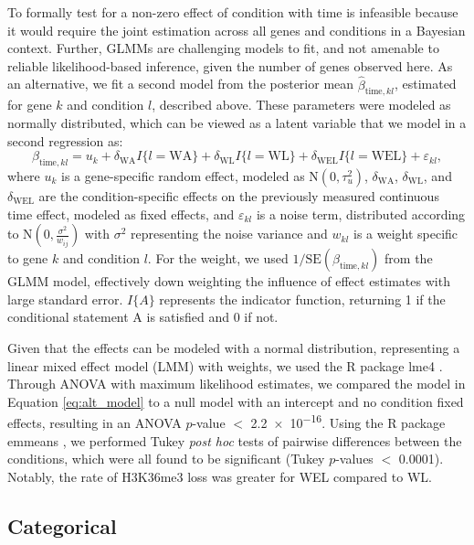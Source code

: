 \documentclass[12pt]{extarticle}
\begin{document}
To formally test for a non-zero effect of condition with time is infeasible because it would require the joint estimation across all genes and conditions in a Bayesian context. Further, GLMMs are challenging models to fit, and not amenable to reliable likelihood-based inference, given the number of genes observed here. As an alternative, we fit a second model from the posterior mean $\widehat{\beta}_{\text{time}, kl}$, estimated for gene $k$ and condition $l$, described above. These parameters were modeled as normally distributed, which can be viewed as a latent variable that we model in a second regression as:
\begin{equation}
	\beta_{\text{time}, kl} = u_{k} + \delta_{\text{WA}}I\{l = \text{WA}\} + \delta_{\text{WL}}I\{l = \text{WL}\} + \delta_{\text{WEL}}I\{l = \text{WEL}\} + \varepsilon_{kl},
	\label{eq:alt_model}
\end{equation}
where $u_{k}$ is a gene-specific random effect, modeled as $\text{N}(0, \tau^{2}_{u})$, $\delta_{\text{WA}}$, $\delta_{\text{WL}}$, and $\delta_{\text{WEL}}$ are the condition-specific effects on the previously measured continuous time effect, modeled as fixed effects, and $\varepsilon_{kl}$ is a noise term, distributed according to $\text{N}(0, \frac{\sigma^{2}}{w_{ij}})$ with $\sigma^{2}$ representing the noise variance and $w_{kl}$ is a weight specific to gene $k$ and condition $l$. For the weight, we used $1/\text{SE}(\beta_{\text{time}, kl})$ from the GLMM model, effectively down weighting the influence of effect estimates with large standard error. $I\{A\}$ represents the indicator function, returning 1 if the conditional statement A is satisfied and 0 if not. 

Given that the effects can be modeled with a normal distribution, representing a linear mixed effect model (LMM) with weights, we used the R package lme4 \cite{Bates2015}. Through ANOVA \cite{Venables2010} with maximum likelihood estimates, we compared the model in Equation \ref{eq:alt_model} to a null model with an intercept and no condition fixed effects, resulting in an ANOVA $p$-value $<$ \num{2.2e-16}. Using the R package emmeans \cite{emmeans}, we performed Tukey \textit{post hoc} tests of pairwise differences \cite{Venables2010} between the conditions, which were all found to be significant (Tukey $p$-values $<$ 0.0001). Notably, the rate of H3K36me3 loss was greater for WEL compared to WL.

\subsection*{Categorical}
\end{document}
